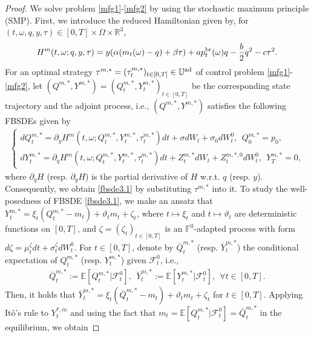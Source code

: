 \documentclass[11pt]{article}
\numberwithin{equation}{section}
\begin{document}
\begin{proof}
We solve problem \eqref{mfg1}-\eqref{mfg2} by using the stochastic maximum principle (SMP). First, we introduce the reduced Hamiltonian given by, for $(t,\omega,q, y,\tau)\in[0,T]\times\Omega\times \mathbb{R}^3$,
\begin{align*}
H^{m}(t, \omega; q, y,\tau)=y(\alpha(m_t(\omega)-q)+\beta\tau)+ap_t^{{\rm br}}(\omega)q-\frac{b}{2}q^2-c\tau^2.    
\end{align*}
For an optimal strategy $\tau^{m,*}=(\tau_t^{m,*})_{t\in[0,T]}\in\mathbb{U}^{\rm ad}$ of control problem \eqref{mfg1}-\eqref{mfg2}, let $(Q^{m,*},Y^{m,*})=(Q^{m,*}_t,Y^{m,*}_t)_{t\in[0,T]}$ be the corresponding state trajectory and the adjoint process, i.e., $(Q^{m,*},Y^{m,*})$ satisfies the following FBSDEs given by 
\begin{align*}
\begin{cases}
    \displaystyle dQ_t^{m,*}=\partial_yH^m(t, \omega; Q_t^{m,*}, Y_t^{m,*}, \tau_t^{m,*})dt+\sigma dW_t+\sigma_0dW_t^0,~~Q_0^{m,*}=p_0,\\[0.6em]
    \displaystyle dY_t^{m,*}=\partial_qH^m(t, \omega; Q_t^{m,*}, Y_t^{m,*}, \tau_t^{m,*})dt+Z_t^{m,*}dW_t+Z_t^{m,*,0}dW_t^0,~~Y_T^{m,*}=0,
\end{cases}
\end{align*}
where $\partial_qH$ (resp. $\partial_yH $) is the partial derivative of $H$ w.r.t. $q$ (resp. $y$). Consequently, we obtain \eqref{fbsde3.1} by substituting $
\tau^{m,*}$ into it. 
To study the well-posedness of FBSDE \eqref{fbsde3.1}, we make an ansatz that $Y_t^{m,*}=\xi_t(Q_t^{m,*}-m_t)+\vartheta_t m_t+\zeta_t$, where $t\mapsto\xi_t$ and $t\mapsto \vartheta_t$ are deterministic functions on $[0, T]$, and $\zeta=(\zeta_t)_{t\in [0,T]}$ is an $\mathbb{F}^0$-adapted process with form $d\zeta=\mu_t^{\zeta}dt+\sigma_t^{\zeta}dW_t^0$. 
For $t\in[0,T]$, denote by $\overline{Q}_t^{m, *}$ (resp. $\overline{Y}_t^{m,*}$) the conditional expectation of $Q_t^{m, *}$ (resp. $Y_t^{m, *}$) given $\mathcal{F}_t^0$, i.e.,
\begin{align}\label{overlineQ}
\overline{Q}_t^{m,*}:=\mathbb{E}[Q_t^{m,*}|\mathcal{F}_t^0], ~~\overline{Y}_t^{m,*}:=\mathbb{E}[Y_t^{m,*}|\mathcal{F}_t^0],~~\forall t\in [0,T] .
\end{align}
Then, it holds that $\overline{Y}_t^{m,*}=\xi_t(\overline{Q}_t^{m,*}-m_t)+\vartheta_t m_t+\zeta_t$ for $t\in[0,T]$.
Applying It\^o's rule to $Y_t^{*, m}$ and using the fact that $m_t=\mathbb{E}[Q_t^{m,*}|\mathcal{F}_t^0]=\overline{Q}_t^{m,*}$ in the equilibrium, we obtain

\end{proof}
\end{document}

